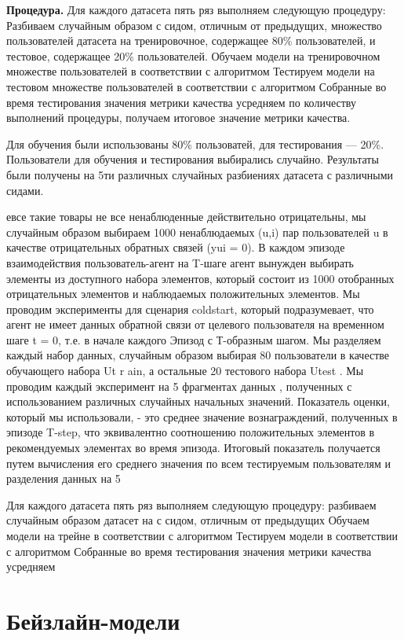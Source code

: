 \documentclass{mipt-thesis-ms}
\begin{document}
{\bf Процедура.} Для каждого датасета пять ряз выполняем следующую процедуру:
Разбиваем случайным образом с сидом, отличным от предыдущих, множество пользователей датасета на тренировочное, содержащее 80\% пользователей, и тестовое, содержащее 20\% пользователей.
Обучаем модели на тренировочном множестве пользователей в соответствии с алгоритмом
Тестируем модели на тестовом множестве пользователей в соответствии с алгоритмом
Собранные во время тестирования значения метрики качества усредняем по количеству выполнений процедуры, получаем итоговое значение метрики качества.

Для обучения были использованы 80\% пользоватей, для тестирования --- 20\%. Пользователи для обучения и тестирования выбирались случайно. Результаты были получены на 5ти различных случайных разбиениях датасета с различными сидами.


евсе такие товары не все ненаблюденные  действительно
отрицательны, мы случайным образом выбираем 1000 ненаблюдаемых (u,i) пар пользователей
u в качестве отрицательных обратных связей (yui = 0). В каждом эпизоде
взаимодействия пользователь-агент на T-шаге агент вынужден выбирать элементы из
доступного набора элементов, который состоит из 1000 отобранных отрицательных элементов
и наблюдаемых положительных элементов. Мы проводим эксперименты для сценария coldstart, который подразумевает, что агент не имеет данных обратной
связи от целевого пользователя на временном шаге t = 0, т.е. в начале каждого
Эпизод с Т-образным шагом. Мы разделяем каждый набор данных, случайным образом выбирая 80%
пользователи в качестве обучающего набора Ut r ain, а остальные 20%
тестового набора Utest . Мы проводим каждый эксперимент на 5 фрагментах данных
, полученных с использованием различных случайных начальных значений. Показатель оценки, который мы
использовали, - это среднее значение вознаграждений, полученных в эпизоде T-step, что
эквивалентно соотношению положительных элементов в рекомендуемых
элементах во время эпизода. Итоговый показатель получается путем вычисления его
среднего значения по всем тестируемым пользователям и разделения данных на 5


Для каждого датасета пять ряз выполняем следующую процедуру:
разбиваем случайным образом датасет на с сидом, отличным от предыдущих
Обучаем модели на трейне в соответствии с алгоритмом
Тестируем модели в соответствии с алгоритмом
Собранные во время тестирования значения метрики качества усредняем 

\section{Бейзлайн-модели}
\end{document}
